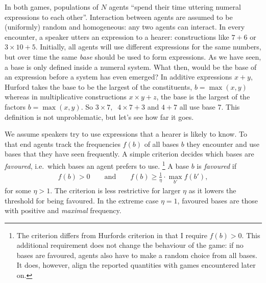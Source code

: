 \documentclass{../src/bcthesispart}
\begin{document}
In both games, populations of $N$ agents “spend their time uttering numeral expressions to each other”.
Interaction between agents are assumed to be (uniformly) random and homogeneous: any two agents can interact.
In every encounter, a speaker utters an expression to a hearer: constructions like $7+6$ or $3\times 10 + 5$.
Initially, all agents will use different expressions for the same numbers, but over time the same \emph{base} should be used to form expressions.
As we have seen, a base is only defined inside a numeral system.
What then, would be the base of an expression before a system has even emerged?
In additive expressions $x+y$, Hurford takes the base to be the largest of the constituents, $b=\max(x,y)$ whereas in multiplicative constructions $x\times y + z$, the base is the largest of the factors $b = \max(x,y)$.
So $3\times 7, \;\; 4 \times 7 + 3$ and $4+7$ all use base 7. 
This definition is not unproblematic, but let’s see how far it goes.



We assume speakers try to use expressions that a hearer is likely to know.
To that end agents track the frequencies $f(b)$ of all bases $b$ they encounter and use bases that they have seen frequently.
A simple criterion decides which bases are \emph{favoured}, i.e.\ which bases an agent prefers to use.%
	\footnote{The criterion differs from Hurfords criterion in that I require $f(b)>0$. 
	This additional requirement does not change the behaviour of the game: if no bases are favoured, agents also have to make a random choice from all bases. 
	It does, however, align the reported quantities with games encountered later on.}
A base $b$ is \emph{favoured} if 
	\begin{align}\label{eq:favoured-base-criterion}
		f(b) > 0 \qquad \text{and} \qquad f(b) \ge \frac{1}{\eta} \cdot \max_{b'} f(b'),
	\end{align}
for some $\eta>1$.
The criterion is less restrictive for larger $\eta$ as it lowers the threshold for being favoured.
In the extreme case $\eta=1$, favoured bases are those with positive and \emph{maximal} frequency.
\end{document}
